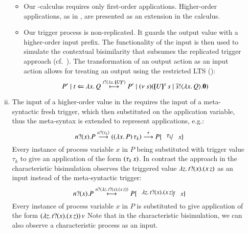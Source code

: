 \begin{enumerate}[i)]
\begin{itemize}
			\item	Our \HOp-calculus requires only first-order
				applications. Higher-order applications,
				as in \cite{JeffreyR05},
				are presented as an extension in the \HOpp
				calculus.

			\item	Our trigger process is non-replicated. 
				It guards the output
				value with a higher-order input prefix. The
				functionality of the input is then used to
				simulate the contextual bisimilarity that subsumes
				the replicated trigger approach (cf.~).
				The transformation of an output action as an input
				action allows for treating an output
				using the restricted LTS ():
				\[
					P' \Par \htrigger{t}{\abs{x}{Q}} \hby{\bactinp{t}{\abs{x}{\mapchar{U}{x}}}}
					P' \Par \news{s}{ (\appl{\mapchar{U}{x}}{s} \Par \bout{\dual{s}}{\abs{x}{Q}} \inact)}
				\]
		\end{itemize}

	\item	The input of a higher-order value in the \cite{JeffreyR05}
		requires 
		the input of a meta-syntactic fresh trigger, which then
		substituted on the application variable, thus the meta-syntax
		is extended to represent applications, e.g.:
		\[
			\binp{n}{x} P \by{\bactinp{n}{\tau_k}} (\appl{(\abs{x}{P})}{\tau_k}) \by{\tau} P \subst{\tau_k}{x} 
		\]
		Every instance of process variable $x$ in $P$ being substituted
		with trigger value $\tau_k$ to give an application of the form $(\tau_k\,x)$.
		In contrast the approach in the characteristic bisimulation observes the
		triggered value
		$\lambda z.\,t ? (x) . (x\,z)$ as an input instead of the
		meta-syntactic trigger:
		\[
			\binp{n}{x} P \hby{\bactinp{n}{\abs{z}\binp{t}{x} (\appl{x}{z})}} P \subst{\abs{z}\binp{t}{x} (\appl{x}{z})}{x}
		\]
		Every instance of process variable $x$ in $P$
		is substituted to give application of the form
		$(\lambda z.\,t ? (x) . (x\,z))\,v$
		Note that in the characteristic bisimulation, 
		we can also observe a characteristic process as an input.
		

\end{enumerate}
